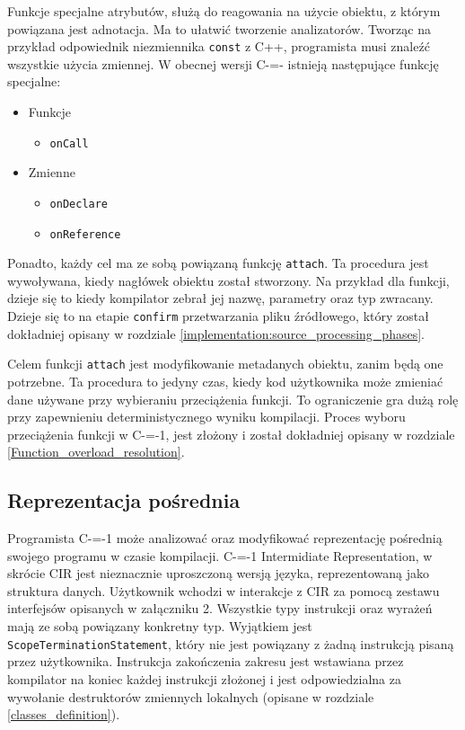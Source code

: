 Funkcje specjalne atrybutów, służą do reagowania na użycie obiektu, z którym powiązana jest adnotacja.
Ma to ułatwić tworzenie analizatorów.
Tworząc na przykład odpowiednik niezmiennika \lstinline{const} z C++, programista musi znaleźć wszystkie użycia zmiennej.
W obecnej wersji C-=- istnieją następujące funkcję specjalne:
\begin{itemize}
	\item Funkcje\begin{itemize}
		\item \lstinline{onCall}
	\end{itemize}
	\item Zmienne\begin{itemize}
		\item \lstinline{onDeclare}
		\item \lstinline{onReference}
	\end{itemize}
\end{itemize}
Ponadto, każdy cel ma ze sobą powiązaną funkcję \lstinline{attach}.
Ta procedura jest wywoływana, kiedy nagłówek obiektu został stworzony.
Na przykład dla funkcji, dzieje się to kiedy kompilator zebrał jej nazwę, parametry oraz typ zwracany.
Dzieje się to na etapie \lstinline{confirm} przetwarzania pliku źródłowego, który został dokładniej opisany w rozdziale \ref{implementation:source_processing_phases}.

Celem funkcji \lstinline{attach} jest modyfikowanie metadanych obiektu, zanim będą one potrzebne.
Ta procedura to jedyny czas, kiedy kod użytkownika może zmieniać dane używane przy wybieraniu przeciążenia funkcji.
To ograniczenie gra dużą rolę przy zapewnieniu deterministycznego wyniku kompilacji.
Proces wyboru przeciążenia funkcji w C-=-1, jest złożony i został dokładniej opisany w rozdziale \ref{Function_overload_resolution}.


\subsection{Reprezentacja pośrednia}\label{reprezentacja_posrednia}
Programista C-=-1 może analizować oraz modyfikować reprezentację pośrednią swojego programu w czasie kompilacji.
C-=-1 Intermidiate Representation, w skrócie CIR jest nieznacznie uproszczoną wersją języka, reprezentowaną jako struktura danych.
Użytkownik wchodzi w interakcje z CIR za pomocą zestawu interfejsów opisanych w załączniku 2.
Wszystkie typy instrukcji oraz wyrażeń mają ze sobą powiązany konkretny typ.
Wyjątkiem jest \lstinline{ScopeTerminationStatement}, który nie jest powiązany z żadną instrukcją pisaną przez użytkownika.
Instrukcja zakończenia zakresu jest wstawiana przez kompilator na koniec każdej instrukcji złożonej i jest odpowiedzialna za wywołanie destruktorów zmiennych lokalnych (opisane w rozdziale \ref{classes_definition}).

